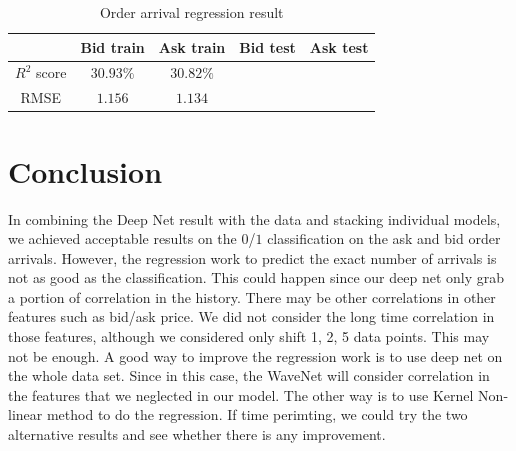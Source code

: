 \documentclass[letterpaper,12pt]{article}
\numberwithin{equation}{section}
\begin{document}
\begin{table}[H]
    \centering
    \caption{ Order arrival regression result}
    \begin{tabular}{c c c c c }
       \hline \hline 
                    & Bid train      &  Ask train    &  Bid test              & Ask test      \\ \hline
        $R^2$ score & $30.93\%$      &  $30.82\%$    &\color{red}{$32.12\%$}  & \color{red}{$26.69\%$} \\ 
        RMSE        & $1.156 $       &  $1.134$      &\color{red}{$0.955$}    & \color{red}{$1.078$}  \\ \hline \hline 
    \end{tabular}
    \label{sec5:tab:regress_result}
\end{table}




\section{Conclusion}

In combining the Deep Net result with the data and stacking individual models, we achieved acceptable results on the $0$/$1$ classification on the ask and bid order arrivals. However, the regression work to predict the exact number of arrivals is not as good as the classification. This could happen since our deep net only grab a portion of correlation in the history. There may be other correlations in other features such as bid/ask price. We did not consider the long time correlation in those features, although we considered only shift 1, 2, 5 data points. This may not be enough. A good way to improve the regression work is to use deep net on the whole data set. Since in this case, the WaveNet will consider correlation in the features that we neglected in our model. The other way is to use Kernel Non-linear method to do the regression. If time perimting, we could try the two alternative results and see whether there is any improvement. 



\end{document}
